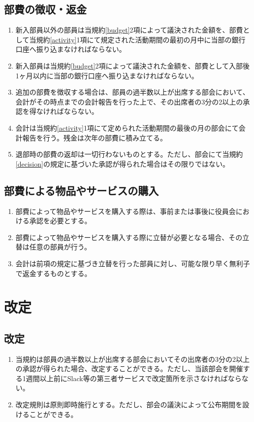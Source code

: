 \documentclass[12pt, unicode, a4paper]{ltjsreport}
\begin{document}
    \section{部費の徴収・返金}
        \begin{enumerate}
            \item 新入部員以外の部員は当規約\ref{budget}2項によって議決された金額を、部費として当規約\ref{activity}1項にて規定された活動期間の最初の月中に当部の銀行口座へ振り込まなければならない。
            \item 新入部員は当規約\ref{budget}2項によって議決された金額を、部費として入部後1ヶ月以内に当部の銀行口座へ振り込まなければならない。
            \item 追加の部費を徴収する場合は、部員の過半数以上が出席する部会において、会計がその時点までの会計報告を行った上で、その出席者の3分の2以上の承認を得なければならない。
            \item 会計は当規約\ref{activity}1項にて定められた活動期間の最後の月の部会にて会計報告を行う。残金は次年の部費に積み立てる。
            \item 退部時の部費の返却は一切行わないものとする。ただし、部会にて当規約\ref{decision}の規定に基づいた承認が得られた場合はその限りではない。
        \end{enumerate}

    \section{部費による物品やサービスの購入}
        \begin{enumerate}
            \item 部費によって物品やサービスを購入する際は、事前または事後に役員会における承認を必要とする。
            \item 部費によって物品やサービスを購入する際に立替が必要となる場合、その立替は任意の部員が行う。
            \item 会計は前項の規定に基づき立替を行った部員に対し、可能な限り早く無利子で返金するものとする。
        \end{enumerate}


\chapter{改定}
    \section{改定}
        \begin{enumerate}
            \item 当規約は部員の過半数以上が出席する部会においてその出席者の3分の2以上の承認が得られた場合、改定することができる。ただし、当該部会を開催する1週間以上前にSlack等の第三者サービスで改定箇所を示さなければならない。
            \item 改定規則は原則即時施行とする。ただし、部会の議決によって公布期間を設けることができる。
        \end{enumerate}
\end{document}
